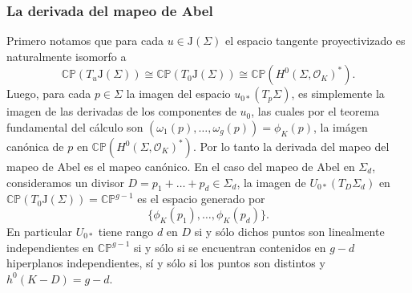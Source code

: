 \documentclass[letterpaper]{article}
\newcommand{\sig}{\ensuremath{\Sigma}}
\newcommand{\cp}{\ensuremath{\mathbb{CP}}}
\newcommand{\lnb}{\ensuremath{\mathcal{O}}}
\newcommand{\jac}{\ensuremath{\mathrm{J}(\sig)}}
\begin{document}
\subsubsection{La derivada del mapeo de Abel}
Primero notamos que para cada \(u\in\jac\) el espacio tangente proyectivizado es  naturalmente isomorfo a
\[
  \cp(T_{u}\jac)\cong\cp(T_{0}\jac)\cong\cp(H^{0}(\sig,\lnb_{K})^{*}).
\]
\noindent Luego, para cada \(p\in\sig\) la imagen del espacio \(u_{0*}(T_{p}\sig)\), es simplemente la imagen de las derivadas de los componentes de \(u_{0}\), las cuales por el teorema fundamental del cálculo son \((\omega_{1}(p),\dots,\omega_{g}(p))=\phi_{K}(p)\), la imágen canónica de \(p\) en \(\cp(H^{0}(\sig,\lnb_{K})^{*})\). Por lo tanto la derivada del mapeo del mapeo de Abel es el mapeo canónico. En el caso del mapeo de Abel en \(\sig_{d}\), consideramos un divisor \(D=p_{1}+\dots+ p_{d}\in\sig_{d}\), la imagen de \(U_{0*}(T_{D}\sig_{d})\) en \(\cp(T_{0}\jac)=\cp^{g-1}\) es el espacio generado por
\[
  \{\phi_{K}(p_{1}),\dots,\phi_{K}(p_{d})\}.
\]
\noindent En particular \(U_{0*}\) tiene rango \(d\) en \(D\) si y sólo dichos puntos son linealmente independientes en \(\cp^{g-1}\) si y sólo si se encuentran contenidos en \(g-d\) hiperplanos independientes, sí y sólo si los puntos son distintos y \(h^{0}(K-D)=g-d\).
\end{document}
